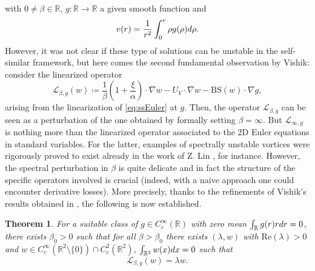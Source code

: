 \documentclass[11pt,reqno]{amsproc}
\newcommand{\red}[1]{\textcolor{red}{#1}}
\def\dd{{\rm d}}
\def\RR {\mathbb{R}}
\newtheorem{theorem}[proposition]{Theorem}
\theoremstyle{definition}
\theoremstyle{definition}
\numberwithin{equation}{section}
\begin{document}
with $0\neq \beta\in \RR$, $g:\RR\to \RR$ a given smooth function and 
\begin{equation}
    \label{def:v}
    v(r)=\frac{1}{r^2}\int_0^r\rho g(\rho)\dd \rho.
\end{equation}
However, it was not clear if these type of solutions can be unstable in the self-similar framework, but here comes the second fundamental observation by Vishik: consider the linearized operator
  \begin{equation}
  \label{def:Lg}
      \mathcal{L}_{\beta,g}(w)\coloneqq\frac{1}{\beta}(1+\frac{\xi}{\alpha})\cdot \nabla w-U_V\cdot \nabla w-\mathrm{BS}(w)\cdot \nabla g,
  \end{equation}
  arising from the linearization of \cref{eq:ssEuler} at $g$. Then, the operator $\mathcal{L}_{\beta,g}$ can be seen as a perturbation of the one obtained by formally setting $\beta=\infty$. But $\mathcal{L}_{\infty,g}$ is nothing more than the linearized operator associated to the 2D Euler equations in standard variables. For the latter, examples of spectrally unstable vortices were rigorously proved to exist already in the work of Z. Lin \cite{lin2003instability}, for instance. However, the spectral perturbation in $\beta$ is quite delicate and in fact the structure of the specific operators involved is crucial (indeed, with a naive approach one could encounter derivative losses).
More precisely, thanks to the refinements of Vishik's results obtained in \cite{vishik_notes,castro2024proof}, the following is now established.
\begin{theorem}
\label{th:unstable}
For a suitable class of $g\in C^{\infty}_c(\RR)$ with zero mean $\int_{\RR}g(r)r\dd r=0$, there exists $\beta_0>0$ such that for all $\beta>\beta_0$ there exists $(\lambda,w)$ with $\mathrm{Re}(\lambda)>0$ and $w\in C^\infty_c(\RR^2\setminus \{0\})\cap C^2_c(\RR^2)$, $\int_{\RR^2}w(x)\dd x=0$ such that
\begin{equation}
    \mathcal{L}_{\beta,g}(w)=\lambda w.
\end{equation}   
\end{theorem}
\end{document}
